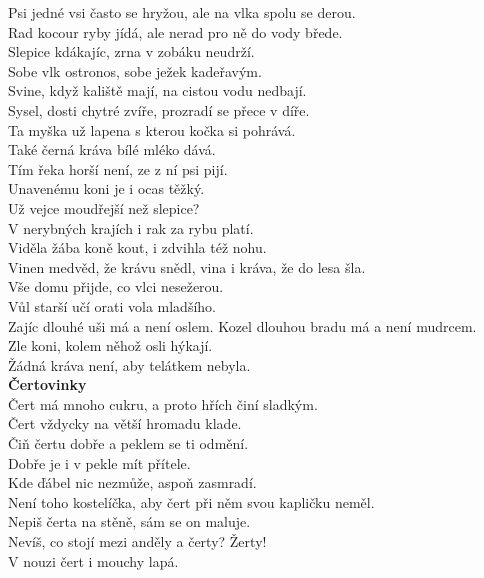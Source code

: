 \begin{multicols}{2}
Psi jedné vsi často se hryžou, ale na vlka spolu se derou.\\
Rad kocour ryby jídá, ale nerad pro ně do vody břede.\\
Slepice kdákajíc, zrna v zobáku neudrží.\\
Sobe vlk ostronos, sobe ježek kadeřavým.\\
Svine, když kaliště mají, na cistou vodu nedbají.\\
Sysel, dosti chytré zvíře, prozradí se přece v díře.\\
Ta myška už lapena s kterou kočka si pohrává.\\
Také černá kráva bílé mléko dává.\\
Tím řeka horší není, ze z ní psi pijí.\\
Unavenému koni je i ocas těžký.\\
Už vejce moudřejší než slepice?\\
V nerybných krajích i rak za rybu platí.\\
Viděla žába koně kout, i zdvihla též nohu.\\
Vinen medvěd, že krávu snědl, vina i kráva, že do lesa šla.\\
Vše domu přijde, co vlci nesežerou.\\
Vůl starší učí orati vola mladšího.\\
Zajíc dlouhé uši má a není oslem. Kozel dlouhou bradu má a není
mudrcem.\\
Zle koni, kolem něhož osli hýkají.\\
Žádná kráva není, aby telátkem nebyla.\\

\noindent
{\large\bf Čertovinky}\\[1 mm]
Čert má mnoho cukru, a proto hřích činí sladkým.\\
Čert vždycky na větší hromadu klade.\\
Čiň čertu dobře a peklem se ti odmění.\\
Dobře je i v pekle mít přítele.\\
Kde ďábel nic nezmůže, aspoň zasmradí.\\
Není toho kostelíčka, aby čert při něm svou kapličku neměl.\\
Nepiš čerta na stěně, sám se on maluje.\\
Nevíš, co stojí mezi anděly a čerty? Žerty!\\
V nouzi čert i mouchy lapá.\\


\end{multicols}

